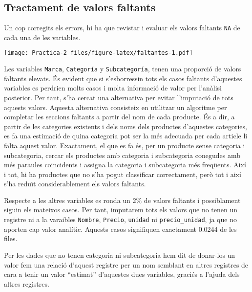 \documentclass[
]{article}
\newenvironment{Shaded}{\begin{snugshade}}{\end{snugshade}}
\newcommand{\AttributeTok}[1]{\textcolor[rgb]{0.13,0.29,0.53}{#1}}
\newcommand{\CommentTok}[1]{\textcolor[rgb]{0.56,0.35,0.01}{\textit{#1}}}
\newcommand{\DecValTok}[1]{\textcolor[rgb]{0.00,0.00,0.81}{#1}}
\newcommand{\FunctionTok}[1]{\textcolor[rgb]{0.13,0.29,0.53}{\textbf{#1}}}
\newcommand{\NormalTok}[1]{#1}
\newcommand{\SpecialCharTok}[1]{\textcolor[rgb]{0.81,0.36,0.00}{\textbf{#1}}}
\begin{document}
\hypertarget{tractament-de-valors-faltants}{%
\subsection{Tractament de valors
faltants}\label{tractament-de-valors-faltants}}

Un cop corregits els errors, hi ha que revistar i evaluar els valors
faltants \texttt{NA} de cada una de les variables.

\texttt{[image: Practica-2\_files/figure-latex/faltantes-1.pdf]}

Les variables \texttt{Marca}, \texttt{Categoría} y
\texttt{Subcategoría}, tenen una proporció de valors faltants elevats.
És evident que si s'esborressin tots els casos faltants d'aquestes
variables es perdrien molts casos i molta informació de valor per
l'anàlisi posterior. Per tant, s'ha cercat una alternativa per evitar
l'imputació de tots aquests valors. Aquesta alternativa consisteix en
utilitzar un algoritme per completar les seccions faltants a partir del
nom de cada producte. És a dir, a partir de les categories existents i
dels noms dels productes d'aquestes categories, es fa una estimació de
quina categoria pot ser la més adecuada per cada article li falta aquest
valor. Exactament, el que es fa és, per un producte sense categoria i
subcategoria, cercar els productes amb categoria i subcategoria
conegudes amb més paraules coincidents i assigna la categoria i
subcategoria més freqüents. Així i tot, hi ha productes que no s'ha
pogut classificar correctament, però tot i així s'ha reduït
considerablement els valors faltants.

Respecte a les altres variables es ronda un 2\% de valors faltants i
possiblament siguin els mateixos casos. Per tant, imputarem tots els
valors que no tenen un registre ni a la varaibles \texttt{Nombre},
\texttt{Precio}, \texttt{unidad} ni \texttt{precio\_unidad}, ja que no
aporten cap valor analític. Aquests casos signifiquen exactament 0.0244
de les files.

Per les dades que no tenen categoria ni subcategoria hem dit de
donar-los un valor fem una relació d'aquest registre per un nom semblant
en altres registres de cara a tenir un valor ``estimat'' d'aquestes dues
variables, graciés a l'ajuda dels altres registres.

\begin{Shaded}
\end{Shaded}
\end{document}
